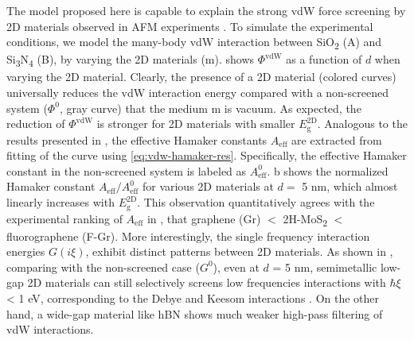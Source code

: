 The model proposed here is capable to explain the
strong vdW force screening by 2D materials observed in AFM experiments
\cite{Tsoi_2014}.
%
To simulate the experimental conditions, we model the
many-body vdW interaction between SiO\textsubscript{2} (A) and Si\textsubscript{3}N\textsubscript{4} (B), by
varying the 2D materials (m).
 shows \(\Phi^{\mathrm{vdW}}\) as a function of
\(d\) when varying the 2D material.
%
Clearly, the presence of a 2D material (colored curves) universally
reduces the vdW interaction energy compared with a non-screened system
(\(\Phi^{0}\), gray curve) that the medium m is vacuum.
%
As expected, the reduction of $\Phi^{\mathrm{vdW}}$ is stronger for 2D
materials with smaller \(E_{\mathrm{g}}^{\mathrm{2D}}\).
%
Analogous to the results presented in
\cite{Tsoi_2014_vdW_screening_2D}, the effective Hamaker constants
\(A_{\mathrm{eff}}\) are extracted from fitting of the curve using
\autoref{eq:vdw-hamaker-res}. 
%
Specifically, the effective Hamaker constant in the non-screened system is labeled as $A_{\mathrm{eff}}^{0}$.
%
b shows the normalized Hamaker constant
$A_{\mathrm{eff}} / A_{\mathrm{eff}}^{0}$ for various 2D materials at
$d=$ 5 nm, which almost linearly increases
with \(E_{\mathrm{g}}^{\mathrm{2D}}\).
%
This
observation quantitatively agrees with the experimental ranking of
\(A_{\mathrm{eff}}\) in \cite{Tsoi_2014_vdW_screening_2D}, that graphene (Gr) $<$ 2H-MoS\textsubscript{2} $<$ fluoro\-graphene (F-Gr).
%
More interestingly, the single frequency interaction energies
\(G(i\xi)\), exhibit distinct patterns between 2D materials. As shown
in , comparing with the non-screened case
($G^{0}$), even at \(d\) = 5 nm, semi\-metallic low-gap 2D materials
can still selectively screens low frequencies interactions with
\(\hbar\xi\) \textless{} 1 eV, corresponding to the Debye and Keesom
interactions \cite{israelachvili_intermolecular_2011}.
%
On the other hand, a wide-gap material like hBN shows much weaker high-pass filtering of vdW interactions.
%

